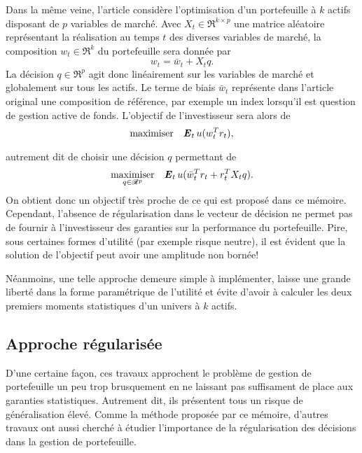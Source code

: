 Dans la même veine, l'article \cite{brandt2009parametric} considère l'optimisation d'un
portefeuille à $k$ actifs disposant de $p$ variables de marché. Avec
$X_t \in \Re^{k \times p}$ une matrice aléatoire représentant la réalisation au temps $t$ des
diverses variables de marché, la composition $w_t \in \Re^k$ du portefeuille sera donnée par
\begin{equation}
  w_t = \bar w_t + X_t q.
\end{equation}
La décision $q \in \Re^p$ agit donc linéairement sur les variables de marché et globalement
sur tous les actifs. Le terme de biais $\bar w_t$ représente dans l'article original une
composition de référence, par exemple un index lorsqu'il est question de gestion active de
fonds. L'objectif de l'investisseur sera alors de
\begin{equation}
  \maximizeEquation{\E_t u(w_t^Tr_t),}
\end{equation}
autrement dit de choisir une décision $q$ permettant de
\begin{equation}
  \maximizeEquation[q \in \Re^p]{\E_t u(\bar w_t^Tr_t + r_t^TX_tq).}
\end{equation}
On obtient donc un objectif très proche de ce qui est proposé dans ce mémoire. Cependant,
l'absence de régularisation dans le vecteur de décision ne permet pas de fournir à
l'investisseur des garanties sur la performance du portefeuille. Pire, sous certaines
formes d'utilité (par exemple risque neutre), il est évident que la solution de l'objectif
peut avoir une amplitude non bornée!

Néanmoins, une telle approche demeure simple à implémenter, laisse une grande liberté dans
la forme paramétrique de l'utilité et évite d'avoir à calculer les deux premiers moments
statistiques d'un univers à $k$ actifs.

\subsection{Approche régularisée}

D'une certaine façon, ces travaux approchent le problème de gestion de portefeuille un peu
trop brusquement en ne laissant pas suffisament de place aux garanties
statistiques. Autrement dit, ils présentent tous un risque de généralisation
élevé. Comme la méthode proposée par ce mémoire, d'autres travaux ont aussi cherché à
étudier l'importance de la régularisation des décisions dans la gestion de portefeuille.

